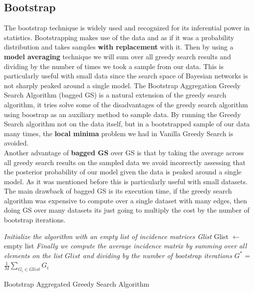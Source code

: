 \documentclass{article}
\begin{document}
	\subsection{Bootstrap}
	The bootstrap technique is widely used and recognized for its inferential
	power in statistics\cite{baggedBS1}. Bootstrapping makes use of the data and as
	if it was a probability distribution and takes samples \textbf{with replacement}
	with it. Then by using a \textbf{model averaging} technique we will sum over all greedy search
	results and dividing by the number of times we took a sample from our data. 
	This is particularly useful with small data since the search space of Bayesian networks is
	not sharply peaked around a single model\cite{baggedBS1}. 
	The Bootstrap Aggregation Greedy Search Algorithm (bagged GS) is a natural
	extension of the greedy search algorithm, it tries solve some of the
	disadvantages of the greedy search algorithm using boostrap as an auxiliary
	method to sample data. By running the Greedy Search algorithm not on the data
	itself, but in a bootstrapped sample of our data many times, the
	\textbf{local minima} problem we had in Vanilla Greedy Search is avoided. \\
	Another advantage of \textbf{bagged GS} over GS is that by taking the average
	across all greedy search results on the sampled data we avoid incorrectly
	assessing that the posterior probability of our model given the data is
	peaked around a single model. As it was mentioned before this is
	particularly useful with small datasets. \\
	The main drawback of bagged GS is its execution time, if the greedy search
	algorithm was expensive to compute over a single dataset with many edges,
	then doing GS over many datasets its just going to multiply the cost by the
	number of bootstrap iterations. 
		\begin{algorithm} %
			\SetAlgoLined
			\emph{Initialize the algorithm with an empty list of incidence matrices
			Glist}\;
			Glist $\gets$ empty list\; 
			\emph{Finally we compute the average incidence matrix by summing over all
				elements on the list $Glist$ and dividing by the number of bootstrap
			iterations}\;
			$G^{*}$ = $\frac{1}{M}\sum_{G_{i} \in Glist}G_{i}$
			\caption{Bootstrap Aggregated Greedy Search Algorithm}
			\label{alg:baggedgreedy}
	  \end{algorithm}	
\end{document}
